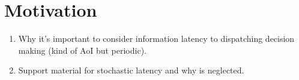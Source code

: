 \section{Motivation}

\begin{enumerate}
    \item Why it's important to consider information latency to dispatching decision making (kind of AoI but periodic).
    \item Support material for stochastic latency and why is neglected.
\end{enumerate}